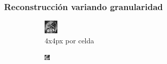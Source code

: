 \documentclass[11pt]{beamer}
\begin{document}
\begin{frame}
    \frametitle{Reconstrucción variando granularidad}
    \begin{figure}[H]
    \centering
    \begin{subfigure}[h]{0.30\textwidth}
        \includegraphics[width=\textwidth]{img/tomo_granu_4.png}
        \caption{4x4px por celda}
        \label{fig:reconstruccion 4 px}
    \end{subfigure}%
    \hfill
    \begin{subfigure}[h]{0.30\textwidth}
            \includegraphics[width=\textwidth]{img/tomo_granu_10.png}

\end{subfigure}
\end{figure}
\end{frame}
\end{document}
